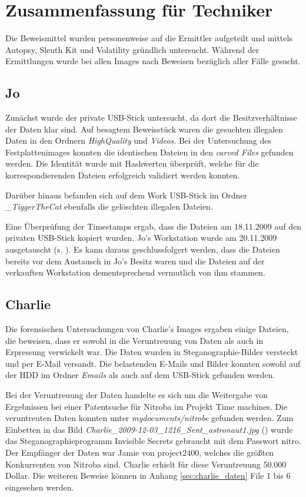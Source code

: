 \chapter{Zusammenfassung für Techniker}
\label{sec:tec}




Die Beweismittel wurden personenweise auf die Ermittler aufgeteilt und mittels Autopsy, Sleuth Kit und Volatility gründlich untersucht. Während der Ermittlungen wurde bei allen Images nach Beweisen bezüglich aller Fälle gesucht.

\section{Jo}
\label{sec:jo}
Zunächst wurde der private USB-Stick untersucht, da dort die Besitzverhältnisse der Daten klar sind. Auf besagtem Beweisstück waren die gesuchten illegalen Daten in den Ordnern \textit{HighQuality} und \textit{Videos}. Bei der Untersuchung des Festplattenimages konnten die identischen Dateien in den \textit{carved Files} gefunden werden. Die Identität wurde mit Hashwerten überprüft, welche für die korrespondierenden Dateien erfolgreich validiert werden konnten. 

Darüber hinaus befanden sich auf dem Work USB-Stick im Ordner \textit{_TiggerTheCat} ebenfalls die gelöschten illegalen Dateien.

Eine Überprüfung der Timestamps ergab, dass die Dateien am 18.11.2009 auf den privaten USB-Stick kopiert wurden. Jo's Workstation wurde am 20.11.2009 ausgetauscht (s. ). Es kann daraus geschlussfolgert werden, dass die Dateien bereits vor dem Austausch in Jo's Besitz waren und die Dateien auf der verkauften Workstation  dementsprechend vermutlich von ihm stammen.

\section{Charlie}
\label{sec:charlie}
Die forensischen Untersuchungen von Charlie's Images ergaben einige Dateien, die beweisen, dass er sowohl in die Veruntreuung von Daten als auch in Erpressung verwickelt war. Die Daten wurden in Steganographie-Bilder versteckt und per E-Mail versandt. Die belastenden E-Mails und Bilder konnten sowohl auf der HDD im Ordner \textit{Emails} als auch auf dem USB-Stick gefunden werden. 

Bei der Veruntreuung der Daten handelte es sich um die Weitergabe von Ergebnissen bei einer Patentsuche für Nitroba im Projekt Time machines. Die veruntreuten Daten konnten unter \textit{mydocuments/nitrobe} gefunden werden. Zum Einbetten in das Bild \textit{Charlie_2009-12-03_1216_Sent_astronaut1.jpg} () wurde das Steganographieprogramm Invisible Secrets gebraucht mit dem Passwort nitro. Der Empfänger der Daten war Jamie von project2400, welches die größten Konkurrenten von Nitroba sind. Charlie erhielt für diese Veruntreuung 50.000 Dollar. Die weiteren Beweise können in Anhang \ref{sec:charlie_daten} File 1 bis 6 eingesehen werden.


